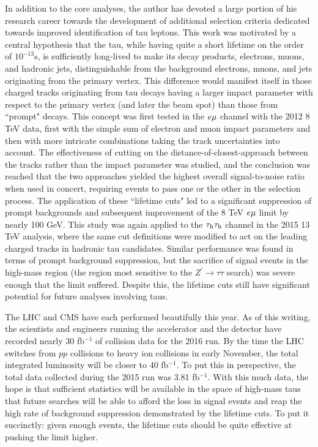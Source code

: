 In addition to the core analyses, the author has devoted a large portion of his research career towards the development of additional selection criteria dedicated towards improved identification of tau leptons. This work was motivated by a central hypothesis that the tau, while having quite a short lifetime on the order of $10^{-13}$s, is sufficiently long-lived to make its decay products, electrons, muons, and hadronic jets, distinguishable from the background electrons, muons, and jets originating from the primary vertex. This difference would manifest itself in those charged tracks originating from tau decays having a larger impact parameter with respect to the primary vertex (and later the beam spot) than those from ``prompt" decays. This concept was first tested in the $e\mu$ channel with the 2012 8 TeV data, first with the simple sum of electron and muon impact parameters and then with more intricate combinations taking the track uncertainties into account. The effectiveness of cutting on the distance-of-closest-approach between the tracks rather than the impact parameter was studied, and the conclusion was reached that the two approaches yielded the highest overall signal-to-noise ratio when used in concert, requiring events to pass one or the other in the selection process. The application of these ``lifetime cuts" led to a significant suppression of prompt backgrounds and subsequent improvement of the 8 TeV $e\mu$ limit by nearly 100 GeV. This study was again applied to the $\tau_{\textrm{h}}\tau_{\textrm{h}}$ channel in the 2015 13 TeV analysis, where the same cut definitions were modified to act on the leading charged tracks in hadronic tau candidates. Similar performance was found in terms of prompt background suppression, but the sacrifice of signal events in the high-mass region (the region most sensitive to the $Z^\prime\to\tau\tau$ search) was severe enough that the limit suffered. Despite this, the lifetime cuts still have significant potential for future analyses involving taus.

The LHC and CMS have each performed beautifully this year. As of this writing, the scientists and engineers running the accelerator and the detector have recorded nearly 30 fb$^{-1}$ of collision data for the 2016 run. By the time the LHC switches from $pp$ collisions to heavy ion collisions in early November, the total integrated luminosity will be closer to 40 fb$^{-1}$\cite{CMSLumi}. To put this in perspective, the total data collected during the 2015 run was 3.81 fb$^{-1}$. With this much data, the hope is that sufficient statistics will be available in the space of high-mass taus that future searches will be able to afford the loss in signal events and reap the high rate of background suppression demonstrated by the lifetime cuts. To put it succinctly: given enough events, the lifetime cuts should be quite effective at pushing the limit higher.

